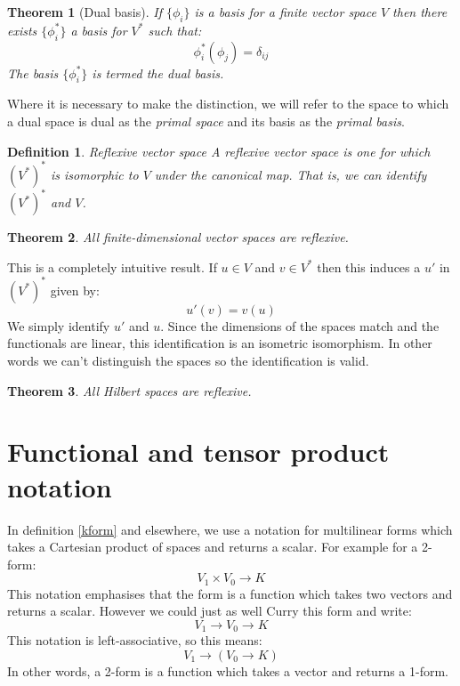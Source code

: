 \documentclass[a4paper,11pt]{article}
\newtheorem{theorem}{Theorem}[section]
\newtheorem{definition}{Definition}[section]
\begin{document}
\begin{theorem}[Dual basis]
If $\{\phi_i\}$ is a basis for a finite vector space $V$ then there exists $\{\phi_i^*\}$ a basis for $V^*$ such that:
\begin{equation} 
    \phi_i^*(\phi_j) = \delta_{ij}
\end{equation} 
The basis $\{\phi_i^*\}$ is termed the \emph{dual basis}.
\end{theorem}
Where it is necessary to make the distinction, we will refer to the space to which a dual space is dual as the \emph{primal space} and its basis as the \emph{primal basis}. 
\begin{definition}{Reflexive vector space}
    A reflexive vector space is one for which $(V^{*})^{*}$ is isomorphic to $V$ under the canonical map. That is, we can identify $(V^*)^*$ and $V$.
\end{definition}
\begin{theorem}
    All finite-dimensional vector spaces are reflexive.
\end{theorem}
This is a completely intuitive result. If $u\in V$ and $v\in V^*$ then this induces a $u'$ in $(V^*)^*$ given by:
\begin{equation}
    u'(v) = v(u)    
\end{equation}
We simply identify $u'$ and $u$. Since the dimensions of the spaces match and the functionals are linear, this identification is an isometric isomorphism. In other words we can't distinguish the spaces so the identification is valid.

\begin{theorem}
    All Hilbert spaces are reflexive.
\end{theorem}

\section{Functional and tensor product notation}

In definition \ref{kform} and elsewhere, we use a notation for multilinear forms which takes a Cartesian product of spaces and returns a scalar. For example for a 2-form:
\begin{equation}
    V_1 \times V_0 \rightarrow K
\end{equation} 
This notation emphasises that the form is a function which takes two vectors and returns a scalar. However we could just as well Curry this form and write:
\begin{equation}  
    V_1 \rightarrow V_0 \rightarrow K
\end{equation} 
This notation is left-associative, so this means:
\begin{equation} 
    V_1 \rightarrow (V_0 \rightarrow K)
\end{equation} 
In other words, a 2-form is a function which takes a vector and returns a 1-form.
\end{document}
